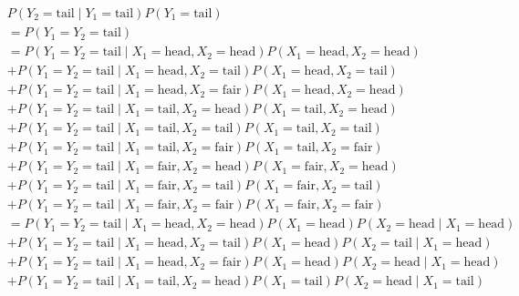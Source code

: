 \begin{solution}
\begin{enumerate}[label = (\alph*)]
    \begin{align*}
        &
        P(Y_2 = \mathrm{tail} \mid Y_1 = \mathrm{tail}) P(Y_1 = \mathrm{tail}) \\
        & =
        P(Y_1 = Y_2 = \mathrm{tail}) \\
        & =
        P(Y_1 = Y_2 = \mathrm{tail} \mid X_1 = \mathrm{head}, X_2 = \mathrm{head}) P(X_1 = \mathrm{head}, X_2 = \mathrm{head}) \\
        & +
        P(Y_1 = Y_2 = \mathrm{tail} \mid X_1 = \mathrm{head}, X_2 = \mathrm{tail}) P(X_1 = \mathrm{head}, X_2 = \mathrm{tail}) \\
        & +
        P(Y_1 = Y_2 = \mathrm{tail} \mid X_1 = \mathrm{head}, X_2 = \mathrm{fair}) P(X_1 = \mathrm{head}, X_2 = \mathrm{head}) \\
        & +
        P(Y_1 = Y_2 = \mathrm{tail} \mid X_1 = \mathrm{tail}, X_2 = \mathrm{head}) P(X_1 = \mathrm{tail}, X_2 = \mathrm{head}) \\
        & +
        P(Y_1 = Y_2 = \mathrm{tail} \mid X_1 = \mathrm{tail}, X_2 = \mathrm{tail}) P(X_1 = \mathrm{tail}, X_2 = \mathrm{tail}) \\
        & +
        P(Y_1 = Y_2 = \mathrm{tail} \mid X_1 = \mathrm{tail}, X_2 = \mathrm{fair}) P(X_1 = \mathrm{tail}, X_2 = \mathrm{fair}) \\
        & +
        P(Y_1 = Y_2 = \mathrm{tail} \mid X_1 = \mathrm{fair}, X_2 = \mathrm{head}) P(X_1 = \mathrm{fair}, X_2 = \mathrm{head}) \\
        & +
        P(Y_1 = Y_2 = \mathrm{tail} \mid X_1 = \mathrm{fair}, X_2 = \mathrm{tail}) P(X_1 = \mathrm{fair}, X_2 = \mathrm{tail}) \\
        & +
        P(Y_1 = Y_2 = \mathrm{tail} \mid X_1 = \mathrm{fair}, X_2 = \mathrm{fair}) P(X_1 = \mathrm{fair}, X_2 = \mathrm{fair}) \\
        & =
        P(Y_1 = Y_2 = \mathrm{tail} \mid X_1 = \mathrm{head}, X_2 = \mathrm{head}) P(X_1 = \mathrm{head}) P(X_2 = \mathrm{head} \mid X_1 = \mathrm{head}) \\
        & +
        P(Y_1 = Y_2 = \mathrm{tail} \mid X_1 = \mathrm{head}, X_2 = \mathrm{tail}) P(X_1 = \mathrm{head}) P(X_2 = \mathrm{tail} \mid X_1 = \mathrm{head}) \\
        & +
        P(Y_1 = Y_2 = \mathrm{tail} \mid X_1 = \mathrm{head}, X_2 = \mathrm{fair}) P(X_1 = \mathrm{head}) P(X_2 = \mathrm{head} \mid X_1 = \mathrm{head}) \\
        & +
        P(Y_1 = Y_2 = \mathrm{tail} \mid X_1 = \mathrm{tail}, X_2 = \mathrm{head}) P(X_1 = \mathrm{tail}) P(X_2 = \mathrm{head} \mid X_1 = \mathrm{tail}) \\

\end{align*}
\end{enumerate}
\end{solution}
